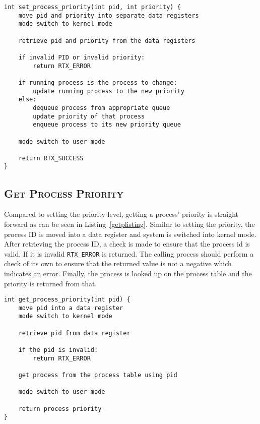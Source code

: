 \documentclass[oneside]{report}
\begin{document}
\begin{lstlisting}
int set_process_priority(int pid, int priority) {
    move pid and priority into separate data registers
    mode switch to kernel mode
    
    retrieve pid and priority from the data registers

    if invalid PID or invalid priority:
        return RTX_ERROR
    
    if running process is the process to change:
        update running process to the new priority
    else:
        dequeue process from appropriate queue
        update priority of that process
        enqueue process to its new priority queue

    mode switch to user mode

    return RTX_SUCCESS
}
\end{lstlisting}

\subsection{\textsc{Get Process Priority}}
Compared to setting the priority level, getting a process' priority is straight
forward as can be seen in Listing~\ref{getplisting}. Similar to setting the
priority, the process ID is moved into a data register and system is switched 
into kernel mode. After retrieving the process ID, a check is made to ensure
that the process id is valid. If it is invalid \texttt{RTX\_ERROR} is returned.
The calling process should perform a check of its own to ensure that
the returned value is not a negative which indicates an error. Finally, the
process is looked up on the process table and the priority is returned from
that.

\begin{lstlisting}
int get_process_priority(int pid) {
    move pid into a data register
    mode switch to kernel mode

    retrieve pid from data register
    
    if the pid is invalid:
        return RTX_ERROR

    get process from the process table using pid
    
    mode switch to user mode

    return process priority
}
\end{lstlisting}
\end{document}
